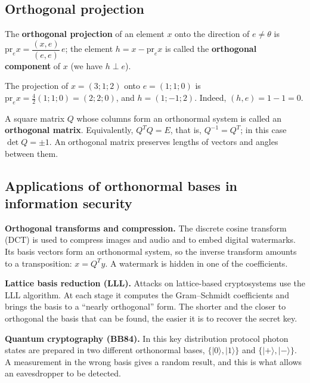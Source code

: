 \subsection{Orthogonal projection}

\begin{tarif}
The \textbf{orthogonal projection} of an element $x$ onto the direction of
$e\neq\theta$ is $\mathrm{pr}_e x=\dfrac{(x,e)}{(e,e)}\,e$; the element
$h=x-\mathrm{pr}_ex$ is called the \textbf{orthogonal component} of $x$ (we have $h\perp e$).
\end{tarif}

\begin{misol}
The projection of $x=(3;1;2)$ onto $e=(1;1;0)$ is
$\mathrm{pr}_ex=\frac42(1;1;0)=(2;2;0)$, and $h=(1;-1;2)$.
Indeed, $(h,e)=1-1=0$.
\end{misol}

\begin{tarif}
A square matrix $Q$ whose columns form an orthonormal system is called an
\textbf{orthogonal matrix}. Equivalently, $Q^TQ=E$, that is, $Q^{-1}=Q^T$;
in this case $\det Q=\pm1$. An orthogonal matrix preserves lengths of vectors and angles between them.
\end{tarif}

\subsection{Applications of orthonormal bases in information security}

\textbf{Orthogonal transforms and compression.} The discrete cosine transform
(DCT) is used to compress images and audio and to embed digital watermarks.
Its basis vectors form an orthonormal system, so the inverse transform amounts
to a transposition: $x=Q^Ty$. A watermark is hidden in one of the coefficients.

\textbf{Lattice basis reduction (LLL).} Attacks on lattice-based cryptosystems
use the LLL algorithm. At each stage it computes the Gram–Schmidt coefficients
and brings the basis to a “nearly orthogonal” form. The shorter and the closer
to orthogonal the basis that can be found, the easier it is to recover the secret key.

\textbf{Quantum cryptography (BB84).} In this key distribution protocol photon
states are prepared in two different orthonormal bases,
$\{|0\rangle,|1\rangle\}$ and $\{|+\rangle,|-\rangle\}$. A measurement in the
wrong basis gives a random result, and this is what allows an eavesdropper to be detected.


